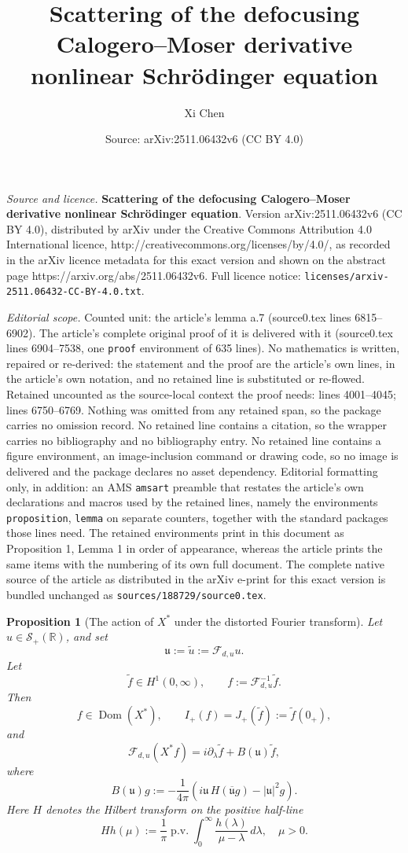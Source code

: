 \documentclass[10pt,a4paper]{amsart}
\title{\textbf{Scattering of the defocusing Calogero--Moser derivative nonlinear Schrödinger equation}}
\author{Xi Chen}
\date{Source: arXiv:2511.06432v6 (CC BY 4.0)}
\newtheorem{proposition}{Proposition}
\begin{document}
\maketitle

\noindent\emph{Source and licence.} \textbf{Scattering of the defocusing Calogero--Moser derivative nonlinear Schrödinger equation}. Version arXiv:2511.06432v6 (CC BY 4.0), distributed by arXiv under the Creative Commons Attribution 4.0 International licence, http://creativecommons.org/licenses/by/4.0/, as recorded in the arXiv licence metadata for this exact version and shown on the abstract page https://arxiv.org/abs/2511.06432v6. Full licence notice: \texttt{licenses/arxiv-2511.06432-CC-BY-4.0.txt}.\par\smallskip

\noindent\textit{Editorial scope.} Counted unit: the article's lemma a.7 (source0.tex lines 6815--6902). The article's complete original proof of it is delivered with it (source0.tex lines 6904--7538, one \texttt{proof} environment of 635 lines). No mathematics is written, repaired or re-derived: the statement and the proof are the article's own lines, in the article's own notation, and no retained line is substituted or re-flowed.  Retained uncounted as the source-local context the proof needs: lines 4001--4045; lines 6750--6769.  Nothing was omitted from any retained span, so the package carries no omission record.  No retained line contains a citation, so the wrapper carries no bibliography and no bibliography entry.  No retained line contains a figure environment, an image-inclusion command or drawing code, so no image is delivered and the package declares no asset dependency.  Editorial formatting only, in addition: an AMS \texttt{amsart} preamble that restates the article's own declarations and macros used by the retained lines, namely the environments \texttt{proposition}, \texttt{lemma} on separate counters, together with the standard packages those lines need.  The retained environments print in this document as Proposition 1, Lemma 1 in order of appearance, whereas the article prints the same items with the numbering of its own full document.  The complete native source of the article as distributed in the arXiv e-print for this exact version is bundled unchanged as \texttt{sources/188729/source0.tex}.
\begin{proposition}[The action of \(X^*\) under the distorted Fourier transform]
\label{prop:Xstar_under_Fd}
Let \(u\in\mathcal S_+(\mathbb R)\), and set
\[
\mathfrak u:=\widetilde u:=\mathcal F_{d,u}u.
\]
Let
\[
\widetilde f\in H^1(0,\infty),
\qquad
f:=\mathcal F_{d,u}^{-1}\widetilde f.
\]
Then
\[
f\in\operatorname{Dom}(X^*),
\qquad
I_+(f)=J_+(\widetilde f):=\widetilde f(0_{+}),
\]
and
\[
\mathcal F_{d,u}(X^*f)
=
i\partial_\lambda\widetilde f
+
B(\mathfrak u)\widetilde f,
\]
where
\[
B(\mathfrak u)g
:=
-\frac1{4\pi}
\left(
i\mathfrak u\,H(\overline{\mathfrak u}g)
-
|\mathfrak u|^2g
\right).
\]
Here \(H\) denotes the Hilbert transform on the positive half-line
\[
H h(\mu)
:=
\frac1\pi\operatorname{p.v.}
\int_0^\infty\frac{h(\lambda)}{\mu-\lambda}\,d\lambda,\quad \mu >0.
\]
\end{proposition}
\end{document}

